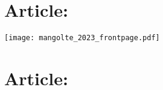 \clearpage

\listoffigures*
{}

\clearpage

\mainmatter
\pagestyle{thesis}








\begin{appendices}
\changeappendixmark%

\chapter{Article: \articleCceTitle}
\label{ax:article-cce}
{%
  \graphicspath{{resources/}}%
  \markboth{\memUChead{\appendixname\ \thechapter}}{}
  \clearpage%
  \centering%
  \texttt{[image: mangolte\_2023\_frontpage.pdf]}
  \clearpage
}

\chapter{Article: \articleReviewTitle}
\label{ax:article-review}



\end{appendices}



\cleardoublepage


